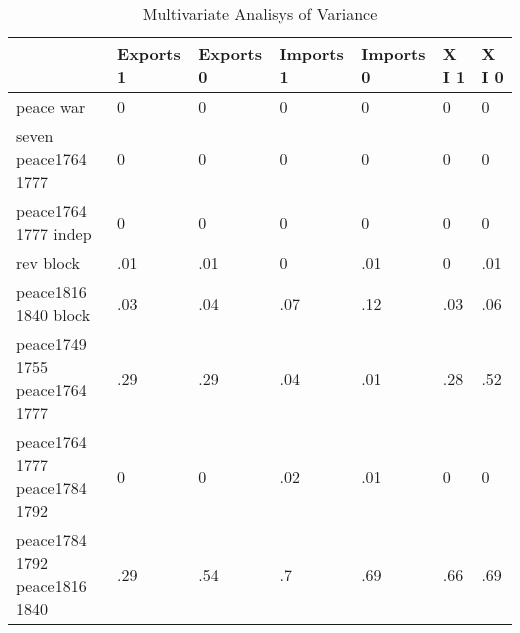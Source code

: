 \begin{table}[htbp]
\caption{\label{tab:manova_test_pays} Multivariate Analisys of Variance}\centering\medskip
\begin{tabular}{|l|l|l|l|l|l|l|}\hline  
 & Exports 1  & Exports 0  & Imports 1  & Imports 0  & X I 1  & X I 0  \\ \hline  
peace war & 0 & 0 & 0 & 0 & 0 & 0 \\ \hline 
seven peace1764 1777 & 0 & 0 & 0 & 0 & 0 & 0 \\ \hline 
peace1764 1777 indep & 0 & 0 & 0 & 0 & 0 & 0 \\ \hline 
rev block & .01 & .01 & 0 & .01 & 0 & .01 \\ \hline 
peace1816 1840 block & .03 & .04 & .07 & .12 & .03 & .06 \\ \hline 
peace1749 1755 peace1764 1777 & .29 & .29 & .04 & .01 & .28 & .52 \\ \hline 
peace1764 1777 peace1784 1792 & 0 & 0 & .02 & .01 & 0 & 0 \\ \hline 
peace1784 1792 peace1816 1840 & .29 & .54 & .7 & .69 & .66 & .69 \\ \hline 
  \end{tabular}
\end{table}
